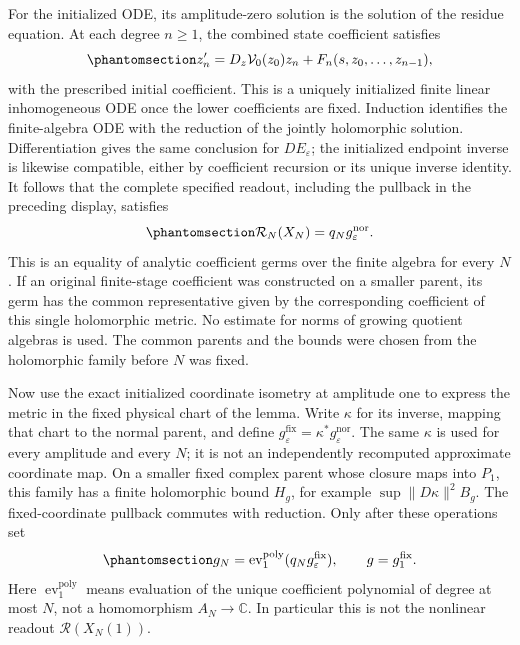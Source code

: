 \documentclass[
  english,
  11pt,
  reqno]{amsart}
\begin{document}
For the initialized ODE, its amplitude-zero solution is the solution of
the residue equation. At each degree \(n\ge1\), the combined state
coefficient satisfies
\begin{equation}\protect\phantomsection\label{eq:sh-r1-finite-ode-recursion}{
 z_n'=D_z\mathcal V_0(z_0)z_n
          +F_n(s,z_0,\ldots,z_{n-1}),
}\end{equation} with the prescribed initial coefficient. This is a
uniquely initialized finite linear inhomogeneous ODE once the lower
coefficients are fixed. Induction identifies the finite-algebra ODE with
the reduction of the jointly holomorphic solution. Differentiation gives
the same conclusion for \(DE_\varepsilon\); the initialized endpoint
inverse is likewise compatible, either by coefficient recursion or its
unique inverse identity. It follows that the complete specified readout,
including the pullback in the preceding display, satisfies
\begin{equation}\protect\phantomsection\label{eq:sh-r1-finite-readout-identity}{
 \mathcal R_N(X_N)=q_N g^{\mathrm{nor}}_\varepsilon.
}\end{equation} This is an equality of analytic coefficient germs over
the finite algebra for every \(N\). If an original finite-stage
coefficient was constructed on a smaller parent, its germ has the common
representative given by the corresponding coefficient of this single
holomorphic metric. No estimate for norms of growing quotient algebras
is used. The common parents and the bounds were chosen from the
holomorphic family before \(N\) was fixed.

Now use the exact initialized coordinate isometry at amplitude one to
express the metric in the fixed physical chart of the lemma. Write
\(\kappa\) for its inverse, mapping that chart to the normal parent, and
define
\(g^{\mathrm{fix}}_\varepsilon=\kappa^*g^{\mathrm{nor}}_\varepsilon\).
The same \(\kappa\) is used for every amplitude and every \(N\); it is
not an independently recomputed approximate coordinate map. On a smaller
fixed complex parent whose closure maps into \(P_1\), this family has a
finite holomorphic bound \(H_g\), for example \(\sup\|D\kappa\|^2B_g\).
The fixed-coordinate pullback commutes with reduction. Only after these
operations set
\begin{equation}\protect\phantomsection\label{eq:sh-r1-final-polynomial-evaluation}{
 g_N=\operatorname{ev}^{\mathrm{poly}}_1
          (q_Ng^{\mathrm{fix}}_\varepsilon),\qquad
 g=g^{\mathrm{fix}}_1.
}\end{equation} Here \(\operatorname{ev}^{\mathrm{poly}}_1\) means
evaluation of the unique coefficient polynomial of degree at most \(N\),
not a homomorphism \(A_N\to\mathbb C\). In particular this is not the
nonlinear readout \(\mathcal R(X_N(1))\).
\end{document}
